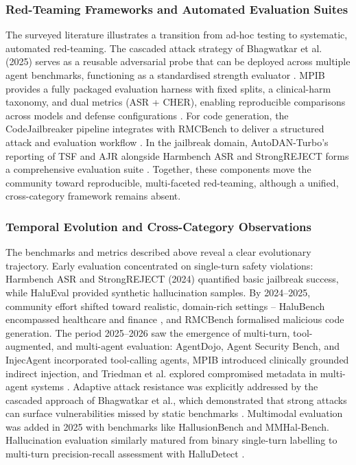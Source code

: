\documentclass[11pt,a4paper]{article}
\begin{document}
\subsubsection{Red-Teaming Frameworks and Automated Evaluation Suites}

The surveyed literature illustrates a transition from ad-hoc testing to systematic, automated red-teaming. The cascaded attack strategy of Bhagwatkar et al. (2025) serves as a reusable adversarial probe that can be deployed across multiple agent benchmarks, functioning as a standardised strength evaluator \cite{Bhagwatkar_2025_Indirect_2ccd3225}. MPIB provides a fully packaged evaluation harness with fixed splits, a clinical-harm taxonomy, and dual metrics (ASR + CHER), enabling reproducible comparisons across models and defense configurations \cite{Lee_2026_LLMs_674de58f}. For code generation, the CodeJailbreaker pipeline integrates with RMCBench to deliver a structured attack and evaluation workflow \cite{Ouyang_2025_LLM_4ccbdde2}. In the jailbreak domain, AutoDAN-Turbo's reporting of TSF and AJR alongside Harmbench ASR and StrongREJECT forms a comprehensive evaluation suite \cite{Liu_2024_LLMs_f40cf88b}. Together, these components move the community toward reproducible, multi-faceted red-teaming, although a unified, cross-category framework remains absent.

\subsubsection{Temporal Evolution and Cross-Category Observations}

The benchmarks and metrics described above reveal a clear evolutionary trajectory. Early evaluation concentrated on single-turn safety violations: Harmbench ASR and StrongREJECT (2024) quantified basic jailbreak success, while HaluEval provided synthetic hallucination samples. By 2024--2025, community effort shifted toward realistic, domain-rich settings -- HaluBench encompassed healthcare and finance \cite{Ravi_2024_Lynx_ce273f20}, and RMCBench formalised malicious code generation. The period 2025--2026 saw the emergence of multi-turn, tool-augmented, and multi-agent evaluation: AgentDojo, Agent Security Bench, and InjecAgent incorporated tool-calling agents, MPIB introduced clinically grounded indirect injection, and Triedman et al. explored compromised metadata in multi-agent systems \cite{Bhagwatkar_2025_Indirect_2ccd3225, Triedman_2025_Multi_99df1b61}. Adaptive attack resistance was explicitly addressed by the cascaded approach of Bhagwatkar et al., which demonstrated that strong attacks can surface vulnerabilities missed by static benchmarks \cite{Bhagwatkar_2025_Indirect_2ccd3225}. Multimodal evaluation was added in 2025 with benchmarks like HallusionBench and MMHal-Bench. Hallucination evaluation similarly matured from binary single-turn labelling to multi-turn precision-recall assessment with HalluDetect \cite{Anaokar_2025_Halludetect_9248653c}.
\end{document}
